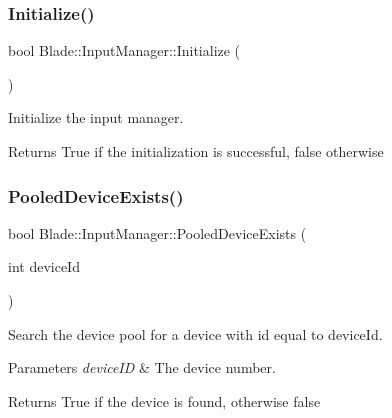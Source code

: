 \subsubsection{\texorpdfstring{Initialize()}{Initialize()}}
{\footnotesize\ttfamily bool Blade\+::\+Input\+Manager\+::\+Initialize (\begin{DoxyParamCaption}{ }\end{DoxyParamCaption})\hspace{0.3cm}{\ttfamily [noexcept]}}



Initialize the input manager. 

\begin{DoxyReturn}{Returns}
True if the initialization is successful, false otherwise 
\end{DoxyReturn}
\mbox{\label{class_blade_1_1_input_manager_ae3ccc72d662ee90161206ef64722380f}} 
\subsubsection{\texorpdfstring{Pooled\+Device\+Exists()}{PooledDeviceExists()}}
{\footnotesize\ttfamily bool Blade\+::\+Input\+Manager\+::\+Pooled\+Device\+Exists (\begin{DoxyParamCaption}\item[{int}]{device\+Id }\end{DoxyParamCaption})}



Search the device pool for a device with id equal to device\+Id. 


\begin{DoxyParams}{Parameters}
{\em device\+ID} & The device number. \\
\hline
\end{DoxyParams}
\begin{DoxyReturn}{Returns}
True if the device is found, otherwise false 
\end{DoxyReturn}
\mbox{\label{class_blade_1_1_input_manager_a6223ce5641fedc88d8e8591deb73ac90}} 
